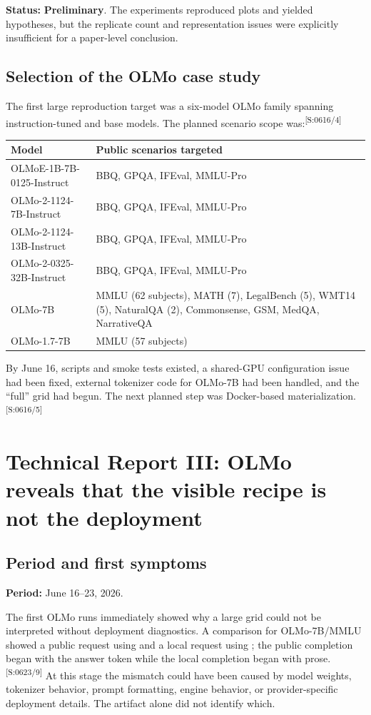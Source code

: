 \documentclass[11pt,oneside]{report}
\newcommand{\code}[1]{\texttt{\detokenize{#1}}}
\newcommand{\statusPreliminary}{\textcolor{preliminary}{\textbf{Preliminary}}\xspace}
\newcommand{\evmark}[1]{\allowbreak\textsuperscript{\scriptsize\textnormal{[#1]}}}
\newcommand{\slideref}[2]{\evmark{S:#1/#2}}
\begin{document}
\textbf{Status:} \statusPreliminary. The experiments reproduced plots and yielded hypotheses, but the replicate count and representation issues were explicitly insufficient for a paper-level conclusion.

\section{Selection of the OLMo case study}

The first large reproduction target was a six-model OLMo family spanning instruction-tuned and base models. The planned scenario scope was:\slideref{0616}{4}

\begin{longtable}{@{}P{0.38\textwidth}P{0.54\textwidth}@{}}
\toprule
Model & Public scenarios targeted \\
\midrule
OLMoE-1B-7B-0125-Instruct & BBQ, GPQA, IFEval, MMLU-Pro \\
OLMo-2-1124-7B-Instruct & BBQ, GPQA, IFEval, MMLU-Pro \\
OLMo-2-1124-13B-Instruct & BBQ, GPQA, IFEval, MMLU-Pro \\
OLMo-2-0325-32B-Instruct & BBQ, GPQA, IFEval, MMLU-Pro \\
OLMo-7B & MMLU (62 subjects), MATH (7), LegalBench (5), WMT14 (5), NaturalQA (2), Commonsense, GSM, MedQA, NarrativeQA \\
OLMo-1.7-7B & MMLU (57 subjects) \\
\bottomrule
\end{longtable}

By June 16, scripts and smoke tests existed, a shared-GPU configuration issue had been fixed, external tokenizer code for OLMo-7B had been handled, and the ``full'' grid had begun. The next planned step was Docker-based materialization.\slideref{0616}{5}

\chapter{Technical Report III: OLMo reveals that the visible recipe is not the deployment}
\label{ch:olmo-first}

\section{Period and first symptoms}

\textbf{Period:} June 16--23, 2026.

The first OLMo runs immediately showed why a large grid could not be interpreted without deployment diagnostics. A comparison for OLMo-7B/MMLU showed a public request using \code{together/olmo-7b} and a local request using \code{vllm/allenai-olmo-7b}; the public completion began with the answer token while the local completion began with prose.\slideref{0623}{9} At this stage the mismatch could have been caused by model weights, tokenizer behavior, prompt formatting, engine behavior, or provider-specific deployment details. The artifact alone did not identify which.
\end{document}
